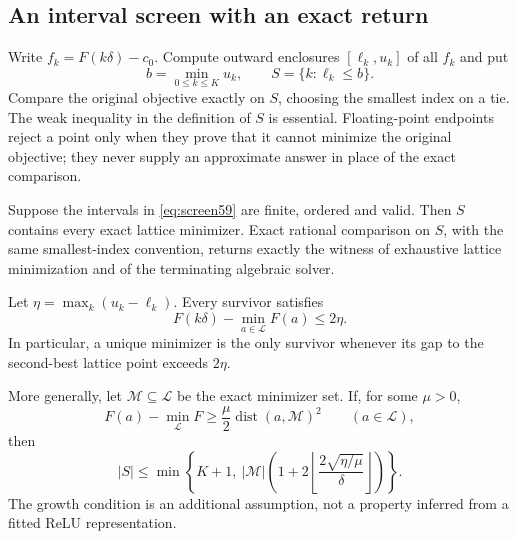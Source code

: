 \subsection{An interval screen with an exact return}
Write $f_k=F(k\delta)-c_0$. Compute outward enclosures $[\ell_k,u_k]$ of all $f_k$ and put
\begin{equation}\label{eq:screen59}
 b=\min_{0\leq k\leq K}u_k,\qquad
 S=\{k:\ell_k\leq b\}.
\end{equation}
Compare the original objective exactly on $S$, choosing the smallest index on a tie. The weak inequality in the definition of $S$ is essential. Floating-point endpoints reject a point only when they prove that it cannot minimize the original objective; they never supply an approximate answer in place of the exact comparison.

\begin{theorem}\label{thm:lossless59}
Suppose the intervals in \eqref{eq:screen59} are finite, ordered and valid. Then $S$ contains every exact lattice minimizer. Exact rational comparison on $S$, with the same smallest-index convention, returns exactly the witness of exhaustive lattice minimization and of the terminating algebraic solver.

Let $\eta=\max_k(u_k-\ell_k)$. Every survivor satisfies
\begin{equation}\label{eq:survivor-gap59}
 F(k\delta)-\min_{a\in\mathcal L}F(a)\leq2\eta.
\end{equation}
In particular, a unique minimizer is the only survivor whenever its gap to the second-best lattice point exceeds $2\eta$.

More generally, let $\mathcal M\subseteq\mathcal L$ be the exact minimizer set. If, for some $\mu>0$,
\[
 F(a)-\min_{\mathcal L}F\geq\frac{\mu}{2}
        \operatorname{dist}(a,\mathcal M)^2\qquad(a\in\mathcal L),
\]
then
\[
 |S|\leq\min\left\{K+1,\ |\mathcal M|
       \left(1+2\left\lfloor\frac{2\sqrt{\eta/\mu}}{\delta}\right\rfloor\right)\right\}.
\]
The growth condition is an additional assumption, not a property inferred from a fitted ReLU representation.
\end{theorem}

